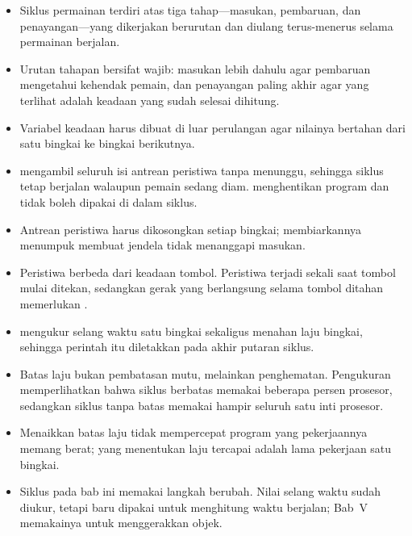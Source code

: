
\begin{rangkumanbox}
\begin{itemize}
  \item Siklus permainan terdiri atas tiga tahap---masukan, pembaruan, dan
        penayangan---yang dikerjakan berurutan dan diulang terus-menerus
        selama permainan berjalan.
  \item Urutan tahapan bersifat wajib: masukan lebih dahulu agar pembaruan
        mengetahui kehendak pemain, dan penayangan paling akhir agar yang
        terlihat adalah keadaan yang sudah selesai dihitung.
  \item Variabel keadaan harus dibuat di luar perulangan agar nilainya bertahan
        dari satu bingkai ke bingkai berikutnya.
  \item {} mengambil seluruh isi antrean peristiwa tanpa
        menunggu, sehingga siklus tetap berjalan walaupun pemain sedang diam.
         menghentikan program dan tidak boleh dipakai
        di dalam siklus.
  \item Antrean peristiwa harus dikosongkan setiap bingkai; membiarkannya
        menumpuk membuat jendela tidak menanggapi masukan.
  \item Peristiwa berbeda dari keadaan tombol. Peristiwa  terjadi
        sekali saat tombol mulai ditekan, sedangkan gerak yang berlangsung
        selama tombol ditahan memerlukan .
  \item {} mengukur selang waktu satu bingkai sekaligus
        menahan laju bingkai, sehingga perintah itu diletakkan pada akhir
        putaran siklus.
  \item Batas laju bukan pembatasan mutu, melainkan penghematan. Pengukuran
        memperlihatkan bahwa siklus berbatas memakai beberapa persen prosesor,
        sedangkan siklus tanpa batas memakai hampir seluruh satu inti
        prosesor.
  \item Menaikkan batas laju tidak mempercepat program yang pekerjaannya memang
        berat; yang menentukan laju tercapai adalah lama pekerjaan satu
        bingkai.
  \item Siklus pada bab ini memakai langkah berubah. Nilai selang waktu sudah
        diukur, tetapi baru dipakai untuk menghitung waktu berjalan; Bab~V
        memakainya untuk menggerakkan objek.
\end{itemize}
\end{rangkumanbox}
